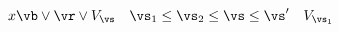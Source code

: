 \documentclass[10pt]{scrartcl}
\begin{document}
\makeatletter
\[
    x
    \vb\lor\vr\lor V_\vs \quad \vs_1 \le \vs_2 \le \vs \le \vs' \quad V_{\vs_1}
\]
\ExplSyntaxOn
\end{document}

